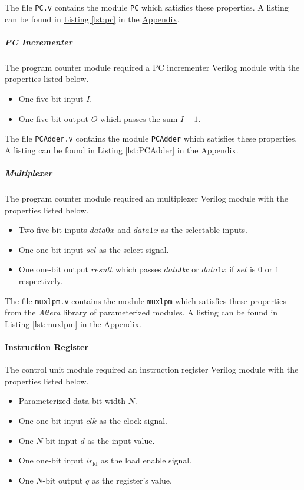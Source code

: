 The file \verb|PC.v| contains the module \verb|PC| which satisfies these properties.
A listing can be found in \hyperref[lst:pc]{Listing \ref*{lst:pc}} in the \hyperref[sec:appendix]{Appendix}.

\subparagraph{PC Incrementer} \label{subpar:pcadder}

The program counter module required a PC incrementer Verilog module with the properties listed below.

\begin{itemize}
    \item One five-bit input $I$.
    \item One five-bit output $O$ which passes the sum $I + 1$.
\end{itemize}

The file \verb|PCAdder.v| contains the module \verb|PCAdder| which satisfies these properties.
A listing can be found in \hyperref[lst:PCAdder]{Listing \ref*{lst:PCAdder}} in the \hyperref[sec:appendix]{Appendix}.

\subparagraph{Multiplexer} \label{subpar:mux}

The program counter module required an multiplexer Verilog module with the properties listed below.

\begin{itemize}
    \item Two five-bit inputs $data0x$ and $data1x$ as the selectable inputs.
    \item One one-bit input $sel$ as the select signal.
    \item One one-bit output $result$ which passes $data0x$ or $data1x$ if $sel$ is 0 or 1 respectively.
\end{itemize}


The file \verb|muxlpm.v| contains the module \verb|muxlpm| which satisfies these properties
from the \emph{Altera} library of parameterized modules.
A listing can be found in \hyperref[lst:muxlpm]{Listing \ref*{lst:muxlpm}} in the \hyperref[sec:appendix]{Appendix}.

\paragraph{Instruction Register} \label{par:ir}

The control unit module required an instruction register Verilog module with the properties listed below.

\begin{itemize}
    \item Parameterized data bit width $N$.
    \item One one-bit input $clk$ as the clock signal.
    \item One $N$-bit input $d$ as the input value.
    \item One one-bit input $ir_\text{ld}$ as the load enable signal.
    \item One $N$-bit output $q$ as the register's value.
\end{itemize}

